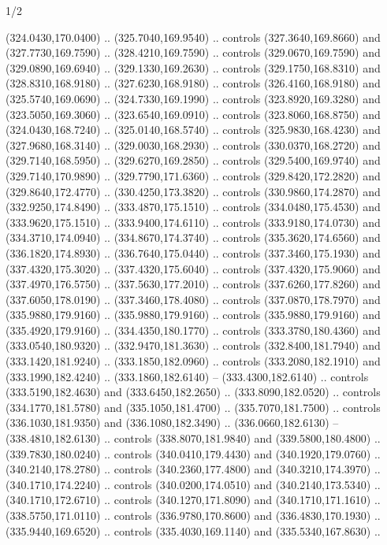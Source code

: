 \begin{flagdescription}{1/2}
\begin{scope}[xshift=0.5\flaglength]
\begin{scope}[scale=0.004\flagwidth,xshift=-90mm,yshift=89mm]
\begin{scope}[y=0.80pt, x=0.80pt, yscale=-1, xscale=1, inner sep=0pt, outer sep=0pt]
  (324.0430,170.0400) .. (325.7040,169.9540) .. controls (327.3640,169.8660) and
  (327.7730,169.7590) .. (328.4210,169.7590) .. controls (329.0670,169.7590) and
  (329.0890,169.6940) .. (329.1330,169.2630) .. controls (329.1750,168.8310) and
  (328.8310,168.9180) .. (327.6230,168.9180) .. controls (326.4160,168.9180) and
  (325.5740,169.0690) .. (324.7330,169.1990) .. controls (323.8920,169.3280) and
  (323.5050,169.3060) .. (323.6540,169.0910) .. controls (323.8060,168.8750) and
  (324.0430,168.7240) .. (325.0140,168.5740) .. controls (325.9830,168.4230) and
  (327.9680,168.3140) .. (329.0030,168.2930) .. controls (330.0370,168.2720) and
  (329.7140,168.5950) .. (329.6270,169.2850) .. controls (329.5400,169.9740) and
  (329.7140,170.9890) .. (329.7790,171.6360) .. controls (329.8420,172.2820) and
  (329.8640,172.4770) .. (330.4250,173.3820) .. controls (330.9860,174.2870) and
  (332.9250,174.8490) .. (333.4870,175.1510) .. controls (334.0480,175.4530) and
  (333.9620,175.1510) .. (333.9400,174.6110) .. controls (333.9180,174.0730) and
  (334.3710,174.0940) .. (334.8670,174.3740) .. controls (335.3620,174.6560) and
  (336.1820,174.8930) .. (336.7640,175.0440) .. controls (337.3460,175.1930) and
  (337.4320,175.3020) .. (337.4320,175.6040) .. controls (337.4320,175.9060) and
  (337.4970,176.5750) .. (337.5630,177.2010) .. controls (337.6260,177.8260) and
  (337.6050,178.0190) .. (337.3460,178.4080) .. controls (337.0870,178.7970) and
  (335.9880,179.9160) .. (335.9880,179.9160) .. controls (335.9880,179.9160) and
  (335.4920,179.9160) .. (334.4350,180.1770) .. controls (333.3780,180.4360) and
  (333.0540,180.9320) .. (332.9470,181.3630) .. controls (332.8400,181.7940) and
  (333.1420,181.9240) .. (333.1850,182.0960) .. controls (333.2080,182.1910) and
  (333.1990,182.4240) .. (333.1860,182.6140) -- (333.4300,182.6140) .. controls
  (333.5190,182.4630) and (333.6450,182.2650) .. (333.8090,182.0520) .. controls
  (334.1770,181.5780) and (335.1050,181.4700) .. (335.7070,181.7500) .. controls
  (336.1030,181.9350) and (336.1080,182.3490) .. (336.0660,182.6130) --
  (338.4810,182.6130) .. controls (338.8070,181.9840) and (339.5800,180.4800) ..
  (339.7830,180.0240) .. controls (340.0410,179.4430) and (340.1920,179.0760) ..
  (340.2140,178.2780) .. controls (340.2360,177.4800) and (340.3210,174.3970) ..
  (340.1710,174.2240) .. controls (340.0200,174.0510) and (340.2140,173.5340) ..
  (340.1710,172.6710) .. controls (340.1270,171.8090) and (340.1710,171.1610) ..
  (338.5750,171.0110) .. controls (336.9780,170.8600) and (336.4830,170.1930) ..
  (335.9440,169.6520) .. controls (335.4030,169.1140) and (335.5340,167.8630) ..

\end{scope}
\end{scope}
\end{scope}
\end{flagdescription}
